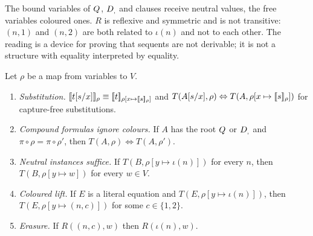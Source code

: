 The bound variables of $Q_{}$, $D_{,}$ and clauses receive neutral values,
the free variables coloured ones. $R$ is reflexive and symmetric and is not
transitive: $(n,1)$ and $(n,2)$ are both related to $\iota(n)$ and not to
each other. The reading is a device for proving that sequents are not
derivable; it is not a structure with equality interpreted by equality.

\begin{lemma}
\label{comp:lem:colour}
Let $\rho$ be a map from variables to $V$.
\begin{enumerate}[label=(\alph*)]
\item \emph{Substitution.}
 $[\![ t[s/x]]\!]_\rho\equiv
 [\![ t]\!]_{\rho[x\mapsto[\![ s]\!]_\rho]}$ and
 $T(A[s/x],\rho)\Leftrightarrow
 T(A,\rho[x\mapsto[\![ s]\!]_\rho])$ for capture-free
 substitutions.
\item \emph{Compound formulas ignore colours.} If $A$ has the root $Q_{}$ or
 $D_{,}$ and $\pi\circ\rho=\pi\circ\rho'$, then
 $T(A,\rho)\Leftrightarrow T(A,\rho')$.
\item \emph{Neutral instances suffice.} If $T(B,\rho[y\mapsto\iota(n)])$ for
 every $n$, then $T(B,\rho[y\mapsto w])$ for every $w\in V$.
\item \emph{Coloured lift.} If $E$ is a literal equation and
 $T(E,\rho[y\mapsto\iota(n)])$, then $T(E,\rho[y\mapsto(n,c)])$ for some
 $c\in\{1,2\}$.
\item \emph{Erasure.} If $R((n,c),w)$ then $R(\iota(n),w)$.
\end{enumerate}
\end{lemma}


